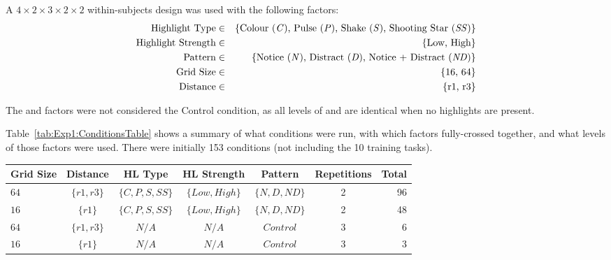 
A $ 4 \times 2 \times 3 \times 2 \times 2 $ within-subjects design was used with the following factors:
\begin{eqnarray*}
\mbox{Highlight Type} & \in & \lbrace \mbox{Colour (\textit{C}), Pulse (\textit{P}), Shake (\textit{S}), Shooting Star (\textit{SS})} \rbrace \\
\mbox{Highlight Strength} & \in & \lbrace \mbox{Low, High} \rbrace \\
\mbox{Pattern} & \in & \lbrace \mbox{Notice (\textit{N}), Distract (\textit{D}), Notice + Distract (\textit{ND})} \rbrace \\
\mbox{Grid Size} & \in & \lbrace \mbox{16, 64} \rbrace \\
\mbox{Distance} & \in & \lbrace \mbox{r1, r3} \rbrace \\
\end{eqnarray*}


The  and  factors were not considered the Control condition, as all levels of  and  are identical when no highlights are present. 


Table~\ref{tab:Exp1:ConditionsTable} shows a summary of what conditions were run, with which factors fully-crossed together, and what levels of those factors were used. There were initially 153 conditions (not including the 10 training tasks).
\begin{table*}[ht]
	\centering
	\begin{tabular}{|l|c||c|c|c||c||r|}
		\hline 
		\textbf{Grid Size} & \textbf{Distance} & \textbf{HL Type} & 
		\textbf{HL Strength} & \textbf{Pattern} & \textbf{Repetitions} & \textbf{Total} \\
		\hline
			$64$ & 
			$\lbrace r1, r3 \rbrace$ &
			$\lbrace C, P, S, SS \rbrace $ & 
			$\lbrace Low, High \rbrace $ & 
			$\lbrace N, D, ND \rbrace$ &
			2 & 96 \\
			$16$ & 
			$\lbrace r1 \rbrace$ &
			$\lbrace C, P, S, SS \rbrace $ & 
			$\lbrace Low, High \rbrace $ & 
			$\lbrace N, D, ND \rbrace$ &
			2 & 48 \\
		
		\hline 
		
			$64$ & 
			$\lbrace r1, r3 \rbrace$ &
			$ N/A $ & 
			$ N/A $ & 
			$ Control $ &
			3 & 6 \\
			$16$ & 
			$\lbrace r1 \rbrace$ &
			$ N/A $ & 
			$ N/A $ & 
			$ Control $ &
			3 & 3 \\
		\hline
	\end{tabular}

\caption{Summary of the conditions that were performed, and the levels of each factor used in each for each of those cells} 
\label{tab:Exp1:ConditionsTable}
\end{table*}
